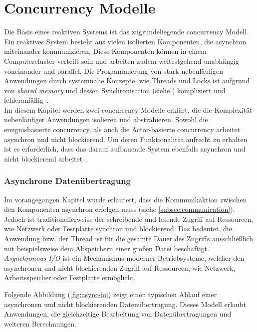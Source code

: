 \section{Concurrency Modelle}\label{sec:concurrency-models}
Die Basis eines reaktiven Systems ist das zugrundeliegende \gls{concurrency} Modell. Ein reaktives System besteht aus vielen isolierten Komponenten, die asynchron miteinander kommunizieren. Diese Komponenten können in einem Computercluster verteilt sein und arbeiten zudem weitestgehend unabhängig voneinander und parallel. Die Programmierung von stark nebenläufigen Anwendungen durch systemnahe Konzepte, wie Threads und Locks ist aufgrund von \textit{shared memory} und dessen Synchronisation (siehe ) kompliziert und fehleranfällig~\cite[S.~72]{erb_concurrent_2012}.\\
Im diesem Kapitel werden zwei \gls{concurrency} Modelle erklärt, die die Komplexität nebenläufiger Anwendungen isolieren und abstrahieren. Sowohl die ereignisbasierte \gls{concurrency}, als auch die Actor-basierte \gls{concurrency} arbeitet asynchron und nicht blockierend. Um deren Funktionalität aufrecht zu erhalten ist es erforderlich, dass das darauf aufbauende System ebenfalls asynchron und nicht blockierend arbeitet~\cite[S.~171]{kuhn_reactive_2015}.

\subsubsection{Asynchrone Datenübertragung}\label{subsec:async-io}
Im vorangegangen Kapitel wurde erläutert, dass die Kommunikaktion zwischen den Komponenten asynchron erfolgen muss (siehe \ref{subsec:communication}). Jedoch ist traditionellerweise der schreibende und lesende Zugriff auf Ressourcen, wie Netzwerk oder Festplatte synchron und blockierend. Das bedeutet, die Anwendung bzw. der Thread ist für die gesamte Dauer des Zugriffs ausschließlich mit beispielsweise dem Abspeichern einer großen Datei beschäftigt.\\
\textit{Asynchronous I/O} ist ein Mechanismus moderner Betriebsysteme, welcher den asynchronen und nicht blockierenden Zugriff auf Ressourcen, wie Netzwerk, Arbeitsspeicher oder Festplatte ermöglicht.

\pagebreak

Folgende Abbildung (\ref{fig:async-io}) zeigt einen typischen Ablauf einer asynchronen und nicht blockierenden Datenübertragung. Dieses Modell erlaubt Anwendungen, die gleichzeitige Bearbeitung von Datenübertragungen und weiteren Berechnungen. 

